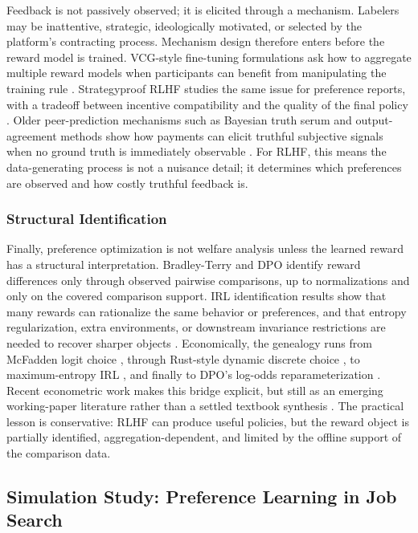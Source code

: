 Feedback is not passively observed; it is elicited through a mechanism. Labelers may be inattentive, strategic, ideologically motivated, or selected by the platform's contracting process. Mechanism design therefore enters before the reward model is trained. VCG-style fine-tuning formulations ask how to aggregate multiple reward models when participants can benefit from manipulating the training rule \citep{sun2024mechanism}. Strategyproof RLHF studies the same issue for preference reports, with a tradeoff between incentive compatibility and the quality of the final policy \citep{kleinebuening2025strategyproof}. Older peer-prediction mechanisms such as Bayesian truth serum and output-agreement methods show how payments can elicit truthful subjective signals when no ground truth is immediately observable \citep{prelec2004bayesian,miller2005eliciting}. For RLHF, this means the data-generating process is not a nuisance detail; it determines which preferences are observed and how costly truthful feedback is.

\subsubsection{Structural Identification}

Finally, preference optimization is not welfare analysis unless the learned reward has a structural interpretation. Bradley-Terry and DPO identify reward differences only through observed pairwise comparisons, up to normalizations and only on the covered comparison support. IRL identification results show that many rewards can rationalize the same behavior or preferences, and that entropy regularization, extra environments, or downstream invariance restrictions are needed to recover sharper objects \citep{cao2021identifiability,skalse2023invariance,knox2022preference}. Economically, the genealogy runs from McFadden logit choice \citep{mcfadden:1973}, through Rust-style dynamic discrete choice \citep{rust1994structural,rust1996numerical}, to maximum-entropy IRL \citep{Ziebart2008}, and finally to DPO's log-odds reparameterization \citep{rafailov2023direct}. Recent econometric work makes this bridge explicit, but still as an emerging working-paper literature rather than a settled textbook synthesis \citep{vanderlaan2025efficient}. The practical lesson is conservative: RLHF can produce useful policies, but the reward object is partially identified, aggregation-dependent, and limited by the offline support of the comparison data.

\subsection{Simulation Study: Preference Learning in Job Search}

